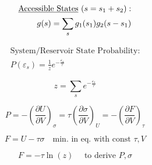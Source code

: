\documentclass[12pt]{article}
\begin{document}
\begin{multicols}{2}

  \begin{equation*}
    \begin{split}
      \text{\underline{Accessible States} } (s=s_1+s_2):\\
      g(s)=\sum_s g_1(s_1)g_2(s-s_1)
    \end{split}
  \end{equation*}
    
  \begin{equation*}
    \begin{split}
      \text{System/Reservoir State Probability:}\\
      P(\varepsilon_s)=\frac{1}{z}e^{-\frac{\varepsilon_s}{\tau}}
    \end{split}
  \end{equation*}

\end{multicols}

\vspace{-30pt}

\begin{multicols}{2}

  \begin{equation*}
    z=\sum_s e^{-\frac{\varepsilon_s}{\tau}}
  \end{equation*}
    
  \begin{equation*}
    P=-\left( \frac{\partial U}{\partial V} \right)_\sigma=\tau\left( \frac{\partial\sigma}{\partial V} \right)_U=-\left( \frac{\partial F}{\partial V} \right)_\tau
  \end{equation*}

\end{multicols}

\vspace{-30pt}

\begin{multicols}{2}

  \begin{equation*}
    F=U-\tau\sigma\quad\text{min. in eq. with const } \tau,V
  \end{equation*}

  \begin{equation*}
    F=-\tau\ln(z)\quad\text{ to derive }P,\sigma
  \end{equation*}

\end{multicols}

\vspace{5pt}
\end{document}
